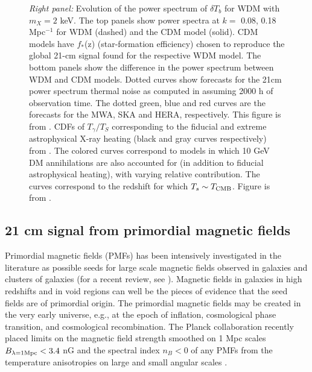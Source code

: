 \documentclass{PoS}
\begin{document}
\begin{figure}[htbp]
\begin{center}
\caption{{\em Right panel: }Evolution of the power spectrum of $\delta T_b$ for WDM with $m_X = 2$ keV. The top panels show power spectra at
$k =$ 0.08, 0.18 Mpc$^{-1}$ for WDM (dashed) and the CDM model (solid). CDM models have $f_*$(z) (star-formation efficiency) chosen to reproduce the global 21-cm signal found for
the respective WDM model. The bottom panels show the difference in the power spectrum between WDM and CDM models. Dotted curves show forecasts
for the 21cm power spectrum thermal noise as computed in \cite{2014MNRAS.439.3262M} assuming 2000 h of observation time. The dotted green, blue and red curves are
the forecasts for the MWA, SKA and HERA, respectively.  This figure is from \cite{2014MNRAS.438.2664S}.
CDFs of $T_\gamma/T_S$ corresponding to the fiducial and extreme astrophysical X-ray heating (black and gray curves respectively) from \cite{2013MNRAS.431..621M}.  The colored curves correspond to models in which 10 GeV DM annihilations are also accounted for (in addition to fiducial astrophysical heating), with varying relative contribution. The curves correspond to the redshift for which $T_s \sim T_{\rm CMB}$. Figure is from \citep{2014arXiv1408.1109E}.}
\label{fig:darkmatter}
\end{center}
\end{figure}

\subsection{21 cm signal from primordial magnetic fields}

Primordial magnetic fields (PMFs) has been intensively investigated in
the literature as possible seeds for large scale magnetic fields
observed in galaxies and clusters of galaxies (for a recent review, see
\citep{2013A&ARv..21...62D}).  Magnetic fields in galaxies in high
redshifts \citep{2008Natur.454..302B} and in void regions
\citep{2010Sci...328...73N,2010ApJ...722L..39A,2013ApJ...771L..42T} can
well be the pieces of evidence that the seed fields are of primordial
origin.  The primordial magnetic fields may be created in the very
early universe, e.g., at the epoch of inflation, cosmological phase
transition, and cosmological recombination.  
The Planck collaboration
recently placed limits on the magnetic field strength smoothed on 1 Mpc scales $B_{\lambda=1{\rm Mpc}} < 3.4$ nG and the spectral index $n_B<0$ of any PMFs
from the temperature anisotropies on large and small angular scales
\citep{2013arXiv1303.5076P}. 
\end{document}
